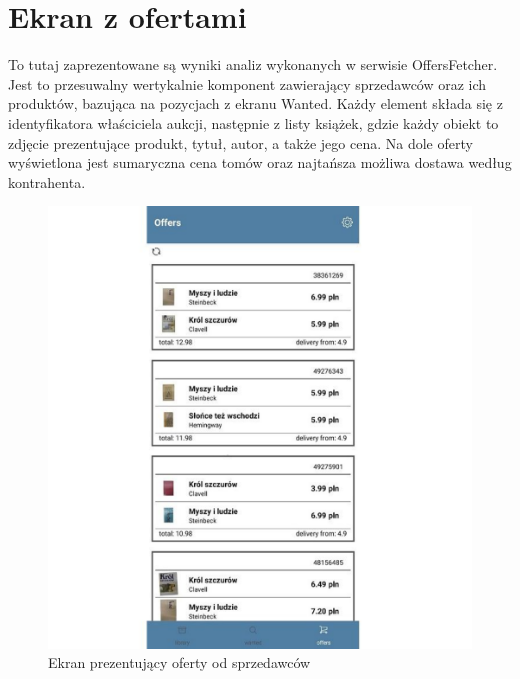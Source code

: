 \section{Ekran z ofertami}
To tutaj zaprezentowane są wyniki analiz wykonanych w serwisie OffersFetcher. Jest to przesuwalny wertykalnie komponent zawierający sprzedawców oraz ich produktów, bazująca na pozycjach z ekranu Wanted. Każdy element składa się z identyfikatora właściciela aukcji, następnie z listy książek, gdzie każdy obiekt to zdjęcie prezentujące produkt, tytuł, autor, a także jego cena. Na dole oferty wyświetlona jest sumaryczna cena tomów oraz najtańsza możliwa dostawa według kontrahenta.
\begin{figure}[H]
	\centering
	\includegraphics[width=\linewidth]{offers.pdf}
	\caption{Ekran prezentujący oferty od sprzedawców}
\end{figure}
\newpage

